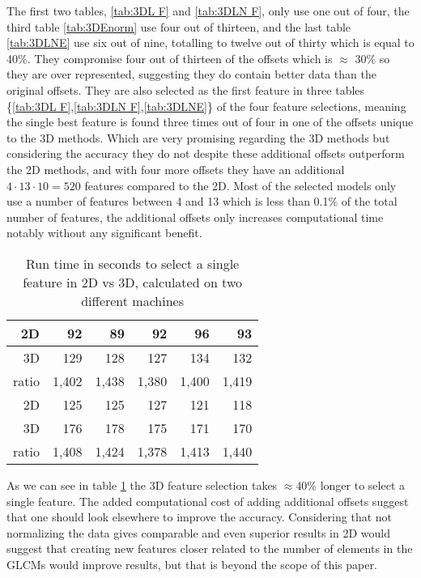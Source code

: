 The first two tables, \ref{tab:3DL F} and \ref{tab:3DLN F}, only use one out of four, the third table \ref{tab:3DEnorm} use four out of thirteen, and the last table \ref{tab:3DLNE} use six out of nine, totalling to twelve out of thirty which is equal to 40\%. They compromise four out of thirteen of the offsets which is $\approx$ 30\% so they are over represented, suggesting they do contain better data than the original offsets. They are also selected as the first feature in three tables \{\ref{tab:3DL F},\ref{tab:3DLN F},\ref{tab:3DLNE}\} of the four feature selections, meaning the single best feature is found three times out of four in one of the offsets unique to the 3D methods. Which are very promising regarding the 3D methods but considering the accuracy they do not despite these additional offsets outperform the 2D methods, and with four more offsets they have an additional $4\cdot13\cdot10 = 520$ features compared to the 2D. Most of the selected models only use a number of features between 4 and 13 which is less than 0.1\% of the total number of features, the additional offsets only increases computational time notably without any significant benefit.
\begin{table}[H]
    \centering
    \begin{tabular}{|r|r|r|r|r|r|}
    \hline
    2D    & 92    & 89    & 92    & 96    & 93 \\ \hline
    3D    & 129   & 128   & 127   & 134   & 132 \\ \hline
    ratio & 1,402 & 1,438 & 1,380 & 1,400 & 1,419 \\ \hline
    2D    & 125   & 125   & 127   & 121   & 118 \\ \hline
    3D    & 176   & 178   & 175   & 171   & 170 \\ \hline
    ratio & 1,408 & 1,424 & 1,378 & 1,413 & 1,440 \\ \hline
    \end{tabular}%
    \caption{Run time in seconds to select a single feature in 2D vs 3D, calculated on two different machines}\label{tab:Time}%
\end{table}%
As we can see in table \ref{tab:Time} the 3D feature selection takes $\approx$40\% longer to select a single feature. The added computational cost of adding additional offsets suggest that one should look elsewhere to improve the accuracy. Considering that not normalizing the data gives comparable and even superior results in 2D would suggest that creating new features closer related to the number of elements in the GLCMs would improve results, but that is beyond the scope of this paper.

